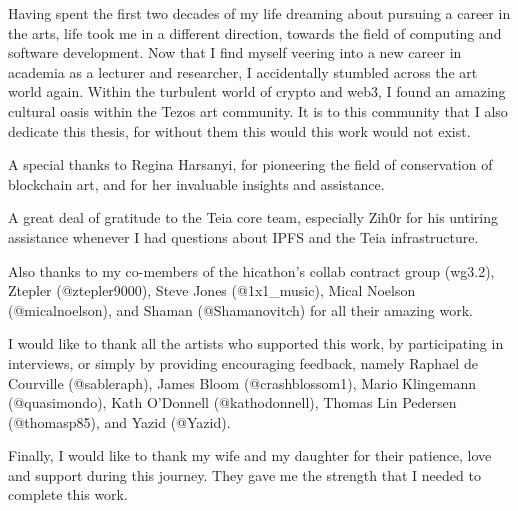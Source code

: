 Having spent the first two decades of my life dreaming about pursuing a career in the arts, life took me in a different direction, towards the field of computing and software development. Now that I find myself veering into a new career in academia as a lecturer and researcher, I accidentally stumbled across the art world again. Within the turbulent world of crypto and web3, I found an amazing cultural oasis within the Tezos art community. It is to this community that I also dedicate this thesis, for without them this would this work would not exist. 

A special thanks to Regina Harsanyi, for pioneering the field of conservation of blockchain art, and for her invaluable insights and assistance.

A great deal of gratitude to the Teia core team, especially Zih0r for his untiring assistance whenever I had questions about IPFS and the Teia infrastructure.

Also thanks to my co-members of the hicathon's collab contract group (wg3.2), Ztepler (@ztepler9000), Steve Jones (@1x1\_music), Mical Noelson (@micalnoelson), and Shaman (@Shamanovitch) for all their amazing work.

I would like to thank all the artists who supported this work, by participating in interviews, or simply by providing encouraging feedback, namely Raphael de Courville (@sableraph), James Bloom (@crashblossom1), 
Mario Klingemann (@quasimondo), Kath O'Donnell (@kathodonnell), Thomas Lin Pedersen (@thomasp85), and Yazid (@Yazid).

Finally, I would like to thank my wife and my daughter for their patience, love and support during this journey. They gave me the strength that I needed to complete this work.


